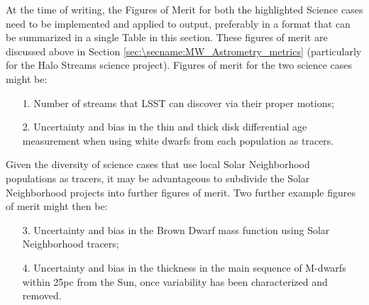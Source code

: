 At the time of writing, the Figures of Merit for both the highlighted
Science cases need to be implemented and applied to \OpSim output,
preferably in a format that can be summarized in a single Table in
this section. These figures of merit are discussed above in Section
\ref{sec:\secname:MW_Astrometry_metrics} (particularly for the Halo
Streams science project). Figures of merit for the two science cases
might be:
\begin{itemize}
  \item[1.] Number of streams that LSST can discover via their proper motions;
\item[2.] Uncertainty and bias in the thin and thick disk differential age measurement when using white dwarfs from each population as tracers.
\end{itemize}

Given the diversity of science cases that use local Solar Neighborhood
populations as tracers, it may be advantageous to subdivide the Solar
Neighborhood projects into further figures of merit. Two further example
figures of merit might then be:
\begin{itemize}
  \item[3.] Uncertainty and bias in the Brown Dwarf mass function using Solar Neighborhood tracers;
   \item[4.] Uncertainty and bias in the thickness in the main sequence of M-dwarfs within 25pc from the Sun, once variability has been characterized and removed.
\end{itemize}


